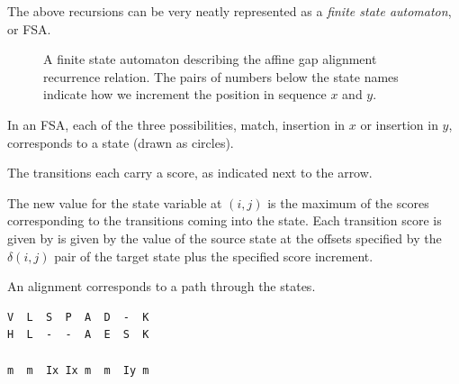 \documentclass[11pt]{article}
\begin{document}
The above recursions can be very neatly represented as a {\em finite state automaton}, or FSA.  

\begin{figure}[ht]
\centering
{}
\caption{A finite state automaton describing the affine gap alignment recurrence relation. The pairs of numbers below the state names indicate how we  increment the position in sequence $x$ and $y$. }
 \label{fig:fsa}
 \end{figure}
 
 
 In an FSA, each of the three possibilities, match, insertion in $x$ or insertion in $y$, corresponds to a state (drawn as circles).  
 
 The transitions each carry a score, as indicated next to the arrow.
 
 The new value for the state variable at $(i,j)$ is the maximum of the scores corresponding to the transitions coming into the state.  Each transition score is given by is given by the value of the source state at the offsets specified by the $\delta (i,j)$ pair of the target state plus the specified score increment.
 
 An alignment corresponds to a path through the states.
 
 \begin{verbatim}
V  L  S  P  A  D  -  K
H  L  -  -  A  E  S  K

m  m  Ix Ix m  m  Iy m
\end{verbatim}
\end{document}
